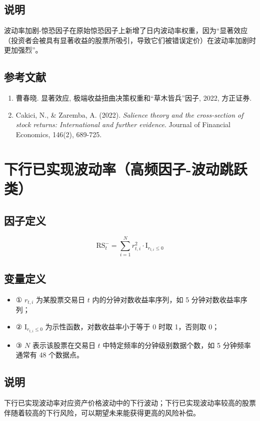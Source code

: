 \documentclass{article}
\begin{document}
\subsection{说明}
波动率加剧-惊恐因子在原始惊恐因子上新增了日内波动率权重，因为“显著效应（投资者会被具有显著收益的股票所吸引，导致它们被错误定价）在波动率加剧时更加强烈”。

\subsection{参考文献}
\begin{enumerate}
    \item 曹春晓. 显著效应, 极端收益扭曲决策权重和“草木皆兵”因子, 2022, 方正证券.
    \item Cakici, N., \& Zaremba, A. (2022). \textit{Salience theory and the cross-section of stock returns: International and further evidence}. Journal of Financial Economics, 146(2), 689-725.
\end{enumerate}

\section{下行已实现波动率（高频因子-波动跳跃类）}

\subsection{因子定义}
\begin{equation}
    \mathrm{RS}_t^- = \sum_{i=1}^N r_{t,i}^2 \cdot \mathrm{I}_{r_{t,i} \leq 0}
\end{equation}

\subsection{变量定义}
\begin{itemize}
    \item ① \( r_{t,i} \) 为某股票交易日 \( t \) 内的分钟对数收益率序列，如 5 分钟对数收益率序列；
    \item ② \( \mathrm{I}_{r_{t,i} \leq 0} \) 为示性函数，对数收益率小于等于 0 时取 1，否则取 0；
    \item ③ \( N \) 表示该股票在交易日 \( t \) 中特定频率的分钟级别数据个数，如 5 分钟频率通常有 48 个数据点。
\end{itemize}

\subsection{说明}
下行已实现波动率对应资产价格波动中的下行波动；下行已实现波动率较高的股票伴随着较高的下行风险，可以期望未来能获得更高的风险补偿。
\end{document}
